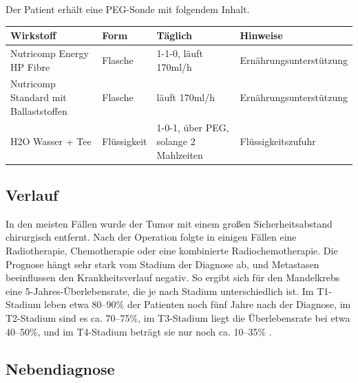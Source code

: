 \documentclass[a4paper,12pt]{article}
\begin{document}
Der Patient erhält eine PEG-Sonde mit folgendem Inhalt.

\begin{longtable}{|p{4cm}|p{2cm}|p{3cm}|p{5cm}|}
	\hline
	\textbf{Wirkstoff}                    & \textbf{Form} & \textbf{Täglich}                      & \textbf{Hinweise}       \\
	\hline
	Nutricomp Energy HP Fibre             & Flasche       & 1-1-0, läuft 170ml/h                  & Ernährungsunterstützung \\
	\hline
	Nutricomp Standard mit Ballaststoffen & Flasche       & läuft 170ml/h                         & Ernährungsunterstützung \\
	\hline
	H2O Wasser + Tee                      & Flüssigkeit   & 1-0-1, über PEG, solange 2 Mahlzeiten & Flüssigkeitszufuhr      \\
	\hline
\end{longtable}

\subsection{Verlauf}
In den meisten Fällen wurde der Tumor mit einem großen Sicherheitsabstand chirurgisch
entfernt. Nach der Operation folgte in einigen Fällen eine Radiotherapie, Chemotherapie
oder eine kombinierte Radiochemotherapie. Die Prognose hängt sehr stark vom Stadium
der Diagnose ab, und Metastasen beeinflussen den Krankheitsverlauf negativ. So ergibt
sich für den Mandelkrebs eine 5-Jahres-Überlebensrate, die je nach Stadium unterschiedlich
ist. Im T1-Stadium leben etwa 80–90\% der Patienten noch fünf Jahre nach der Diagnose,
im T2-Stadium sind es ca. 70–75\%, im T3-Stadium liegt die Überlebensrate bei etwa
40–50\%, und im T4-Stadium beträgt sie nur noch ca. 10–35\% \cite{germanyMandelkrebsSpezialistenInformationen}.

\subsection{Nebendiagnose}
\end{document}
